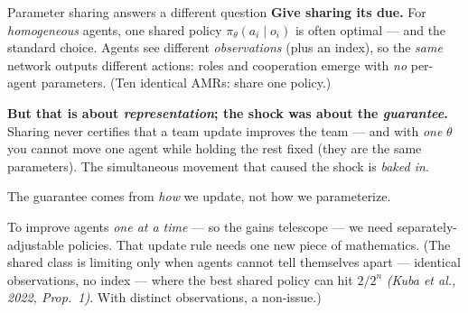 \documentclass[10pt, aspectratio=169]{beamer}
\newcommand{\paper}[1]{\textcolor{mLightBrown}{\small\textit{(#1)}}}
\begin{document}
\begin{frame}{Parameter sharing answers a different question}
\textbf{Give sharing its due.} For \emph{homogeneous} agents, one shared policy $\pi_\theta(a_i\mid o_i)$ is often \alert{optimal} --- and the standard choice. Agents see different \emph{observations} (plus an index), so the \emph{same} network outputs different actions: roles and cooperation emerge with \emph{no} per-agent parameters. (Ten identical AMRs: share one policy.)
\medskip

\pause
\textbf{But that is about \emph{representation}; the shock was about the \emph{guarantee}.} Sharing never certifies that a team update improves the team --- and with \emph{one} $\theta$ you \alert{cannot move one agent while holding the rest fixed} (they are the same parameters). The simultaneous movement that caused the shock is \emph{baked in}.
\medskip

\pause
\begin{center}
\alert{The guarantee comes from \emph{how} we update, not how we parameterize.}
\end{center}
To improve agents \emph{one at a time} --- so the gains telescope --- we need separately-adjustable policies. That update rule needs one new piece of mathematics.
\smallskip
{\footnotesize\textcolor{mLightBrown}{(The shared class is limiting only when agents cannot tell themselves apart --- identical observations, no index --- where the best shared policy can hit $2/2^n$ \paper{Kuba et al., 2022, Prop.\ 1}. With distinct observations, a non-issue.)}}
\end{frame}
\end{document}
